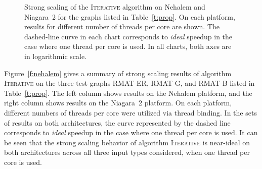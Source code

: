 \documentclass{article}
\begin{document}
\begin{figure}
\centering
{}
\caption{\small Strong scaling of the \textsc{Iterative} algorithm on Nehalem and Niagara~2
for the graphs listed in Table~\ref{t:prop}.
On each platform, results for different number of threads per core are shown. 
The dashed-line curve in each chart corresponds to {\em ideal} speedup in the case where 
one thread per core is used. In all charts, both axes are in logarithmic scale.}
\label{f:nehalem}
\label{f:niagara}
\end{figure}

Figure~\ref{f:nehalem} gives a summary of strong scaling results of algorithm \textsc{Iterative} 
on the three test graphs RMAT-ER, RMAT-G, and RMAT-B listed in Table~\ref{t:prop}.
The left column shows results on the Nehalem platform, 
and the right column shows results on the Niagara~2 platform. 
On each platform, different numbers of threads per core were utilized via thread binding.
In the sets of results on both architectures, the curve
represented by the dashed line corresponds to {\em ideal} speedup
in the case where one thread per core is used.
It can be seen that the strong scaling behavior of algorithm \textsc{Iterative} is near-ideal
on both architectures across all three input types considered, when one thread per core is used.
\end{document}
